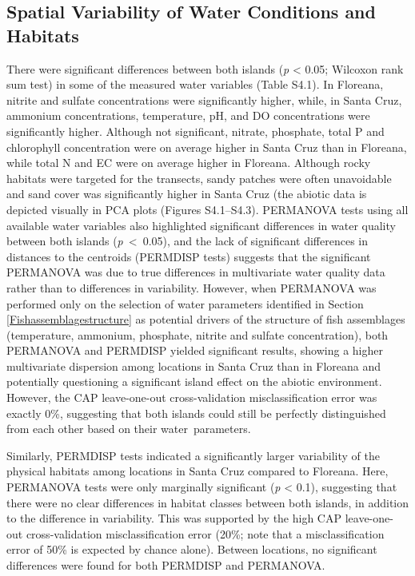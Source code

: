 \documentclass[jmse,article,accept,moreauthors,pdftex]{Definitions/mdpi}
\begin{document}
\subsection{Spatial Variability of Water Conditions and Habitats}

There were significant differences between both islands (\textit{p} < 0.05; Wilcoxon rank sum test) in some of the measured water variables (Table S4.1). In Floreana, nitrite and sulfate concentrations were significantly higher, while, in Santa Cruz, ammonium concentrations, temperature, pH, and DO concentrations were significantly higher. Although not significant, nitrate, phosphate, total P and chlorophyll concentration were on average higher in Santa Cruz than in Floreana, while total N and EC were on average higher in Floreana. Although rocky habitats were targeted for the transects, sandy patches were often unavoidable and sand cover was significantly higher in Santa Cruz (the abiotic data is depicted visually in PCA plots (Figures S4.1--S4.3). PERMANOVA tests using all available water variables also highlighted significant differences in water quality between both islands \mbox{(\textit{p} < 0.05)}, and the lack of significant differences in distances to the centroids (PERMDISP tests) suggests that the significant PERMANOVA was due to true differences in multivariate water quality data rather than to differences in variability. However, when PERMANOVA was performed only on the selection of water parameters identified in Section \ref{Fishassemblagestructure} as potential drivers of the structure of fish assemblages (temperature, ammonium, phosphate, nitrite and sulfate concentration), both PERMANOVA and PERMDISP yielded significant results, showing a higher multivariate dispersion among locations in Santa Cruz than in Floreana and potentially questioning a significant island effect on the abiotic environment. However, the CAP leave-one-out cross-validation misclassification error was exactly 0\%, suggesting that both islands could still be perfectly distinguished from each other based on their water~parameters. 

Similarly, PERMDISP tests indicated a significantly larger variability of the physical habitats among locations in Santa Cruz compared to Floreana. Here, PERMANOVA tests were only marginally significant (\textit{p} < 0.1), suggesting that there were no clear differences in habitat classes between both islands, in addition to the difference in variability. This was supported by the high CAP leave-one-out cross-validation misclassification error (20\%; note that a misclassification error of 50\% is expected by chance alone). Between locations, no significant differences were found for both PERMDISP and PERMANOVA.
\end{document}
